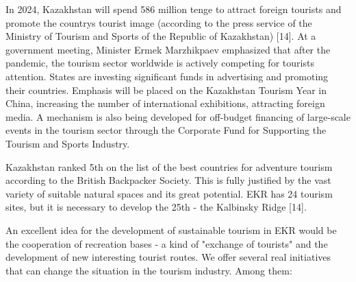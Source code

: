 \begin{multicols}{2}
In 2024, Kazakhstan will spend 586 million tenge to attract foreign
tourists and promote the country\textquotesingle s tourist image
(according to the press service of the Ministry of Tourism and Sports of
the Republic of Kazakhstan) {[}14{]}. At a government meeting, Minister
Ermek Marzhikpaev emphasized that after the pandemic, the tourism sector
worldwide is actively competing for tourists\textquotesingle{}
attention. States are investing significant funds in advertising and
promoting their countries. Emphasis will be placed on the Kazakhstan
Tourism Year in China, increasing the number of international
exhibitions, attracting foreign media. A mechanism is also being
developed for off-budget financing of large-scale events in the tourism
sector through the Corporate Fund for Supporting the Tourism and Sports
Industry.

Kazakhstan ranked 5th on the list of the best countries for adventure
tourism according to the British Backpacker Society. This is fully
justified by the vast variety of suitable natural spaces and its great
potential. EKR has 24 tourism sites, but it is necessary to develop the
25th - the Kalbinsky Ridge {[}14{]}.

An excellent idea for the development of sustainable tourism in EKR
would be the cooperation of recreation bases - a kind of "exchange of
tourists" and the development of new interesting tourist routes. We
offer several real initiatives that can change the situation in the
tourism industry. Among them:


\end{multicols}
